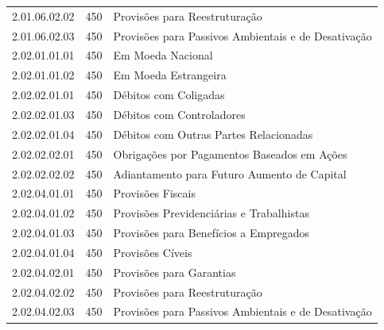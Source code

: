 \begin{table}[ht]
\begin{tabular}{lrl}
  2.01.06.02.02 & 450 & Provisões para Reestruturação \\ 
  2.01.06.02.03 & 450 & Provisões para Passivos Ambientais e de Desativação \\ 
  2.02.01.01.01 & 450 & Em Moeda Nacional \\ 
  2.02.01.01.02 & 450 & Em Moeda Estrangeira \\ 
  2.02.02.01.01 & 450 & Débitos com Coligadas \\ 
  2.02.02.01.03 & 450 & Débitos com Controladores \\ 
  2.02.02.01.04 & 450 & Débitos com Outras Partes Relacionadas \\ 
  2.02.02.02.01 & 450 & Obrigações por Pagamentos Baseados em Ações \\ 
  2.02.02.02.02 & 450 & Adiantamento para Futuro Aumento de Capital \\ 
  2.02.04.01.01 & 450 & Provisões Fiscais \\ 
  2.02.04.01.02 & 450 & Provisões Previdenciárias e Trabalhistas \\ 
  2.02.04.01.03 & 450 & Provisões para Benefícios a Empregados \\ 
  2.02.04.01.04 & 450 & Provisões Cíveis \\ 
  2.02.04.02.01 & 450 & Provisões para Garantias \\ 
  2.02.04.02.02 & 450 & Provisões para Reestruturação \\ 
  2.02.04.02.03 & 450 & Provisões para Passivos Ambientais e de Desativação \\ 
   \hline
\end{tabular}
\end{table}
